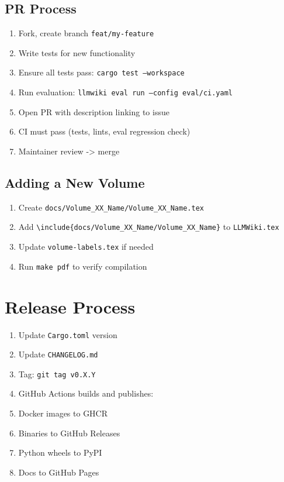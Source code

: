 \subsection{PR Process}
\begin{enumerate}
  \item Fork, create branch \texttt{feat/my-feature}
  \item Write tests for new functionality
  \item Ensure all tests pass: \texttt{cargo test --workspace}
  \item Run evaluation: \texttt{llmwiki eval run --config eval/ci.yaml}
  \item Open PR with description linking to issue
  \item CI must pass (tests, lints, eval regression check)
  \item Maintainer review -> merge
\end{enumerate}

\subsection{Adding a New Volume}
\begin{enumerate}
  \item Create \texttt{docs/Volume\_XX\_Name/Volume\_XX\_Name.tex}
  \item Add \texttt{\textbackslash include\{docs/Volume\_XX\_Name/Volume\_XX\_Name\}} to \texttt{LLMWiki.tex}
  \item Update \texttt{volume-labels.tex} if needed
  \item Run \texttt{make pdf} to verify compilation
\end{enumerate}

\section{Release Process}
\label{sec:dev:release}

\begin{enumerate}
  \item Update \texttt{Cargo.toml} version
  \item Update \texttt{CHANGELOG.md}
  \item Tag: \texttt{git tag v0.X.Y}
  \item GitHub Actions builds and publishes:
    \item Docker images to GHCR
    \item Binaries to GitHub Releases
    \item Python wheels to PyPI
    \item Docs to GitHub Pages
\end{enumerate}

